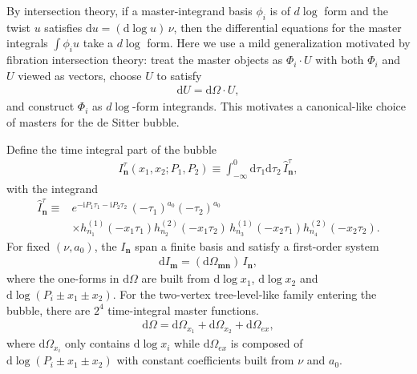 \documentclass[a4paper]{article}
\def\di{{\mathrm{d}}}
\def\ii{\mathrm{i}}
\begin{document}
By intersection theory, if a master-integrand basis $\phi_i$ is of $d\log$ form and the twist $u$ satisfies $\di u=(\di\log u)\,\nu$, then the differential equations for the master integrals $\int \phi_i u$ take a $d\log$ form. Here we use a mild generalization motivated by fibration intersection theory: treat the master objects as $\Phi_i\cdot U$ with both $\Phi_i$ and $U$ viewed as vectors, choose $U$ to satisfy
\begin{align}
	\di U = \di\Omega \cdot U,
\end{align}
and construct $\Phi_i$ as $d\log$-form integrands. This motivates a canonical-like choice of masters for the de Sitter bubble.

Define the time integral part of the bubble
\begin{align}
	I^{\tau}_{\bm n}(x_1,x_2;P_1,P_2)\equiv \int_{-\infty}^0 \di\tau_1\di\tau_2\,\hat{I}^{\tau}_{\bm n},
\end{align}
with the integrand
\begin{align}
	\hat{I}^{\tau}_{\bm n} \equiv & e^{-\ii P_1\tau_1-\ii P_2\tau_2}\,(-\tau_1)^{a_0}(-\tau_2)^{a_0} \nonumber\\
	&\times h_{n_1}^{(1)}(-x_1\tau_1)h_{n_2}^{(2)}(-x_1\tau_2)\,h_{n_3}^{(1)}(-x_2\tau_1)h_{n_4}^{(2)}(-x_2\tau_2).
\end{align}
For fixed $(\nu,a_0)$, the $I_{\bm n}$ span a finite basis and satisfy a first-order system
\begin{align}
	\di I_{\bm m}=(\di\Omega_{\bm m\bm n})\,I_{\bm n},
\end{align}
where the one-forms in $\di\Omega$ are built from $\di\log x_1$, $\di\log x_2$ and $\di\log(P_i\pm x_1\pm x_2)$.
For the two-vertex tree-level-like family entering the bubble, there are $2^4$ time-integral master functions.
\begin{align}
	\di\Omega=\di\Omega_{x_1}+\di\Omega_{x_2}+\di\Omega_{ex},
\end{align}
where $\di\Omega_{x_i}$ only contains $\di\log x_i$ while $\di\Omega_{ex}$ is composed of $\di\log(P_i\pm x_1\pm x_2)$ with constant coefficients built from $\nu$ and $a_0$.
\end{document}
